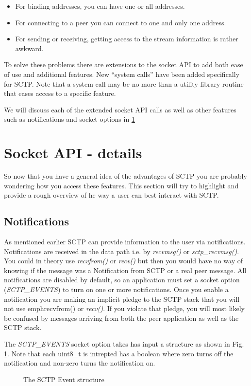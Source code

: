 \documentclass[conference]{IEEEtran}
\begin{document}
\begin{itemize}
 \item  For binding addresses, you can have one or all addresses.
 \item  For connecting to a peer you can connect to one and only one address.
 \item  For sending or receiving, getting access to the stream information is rather awkward.
\end{itemize}

To solve these problems there are extensions to the socket API to add
both ease of use and additional features. New ``system calls'' have been added
specifically for SCTP. Note that a system call may be no more than a utility library
routine that eases access to a specific feature. 

We will discuss each of the extended socket API calls as well as other features such
as notifications and socket options in \ref{adv}


\section{Socket API - details}
\label{adv}
So now that you have a general idea of the advantages of SCTP you are probably
wondering how you access these features. This section will try to highlight and provide
a rough overview of he way a user can best interact with SCTP.

\subsection{Notifications}

As mentioned earlier SCTP can provide information to the user via
notifications. Notifications are received in the data path i.e. by \emph{recvmsg()} or \emph{sctp\_recvmsg()}. You
could in theory use \emph{recvfrom()} or \emph{recv()} but then you would have no way of knowing if
the message was a Notification from SCTP or a real peer message.  All notifications are disabled by default, so
an application must set a socket option (\emph{SCTP\_EVENTS}) to turn on one or more notifications. Once you 
enable a notification you are making an implicit pledge to the SCTP stack that you will not use emph{recvfrom()} or \emph{recv()}.
If you violate that pledge, you will most likely be confused by messages arriving from both the peer application as well as
the SCTP stack.

The \emph{SCTP\_EVENTS} socket option takes has input a structure as shown
in Fig. \ref{fig:events}. Note that each uint8\_t is intrepted has a boolean where zero turns off the 
notification and non-zero turns the notification on.
\begin{figure}

\caption{The SCTP Event structure}
\label{fig:events}
\end{figure}
\end{document}
